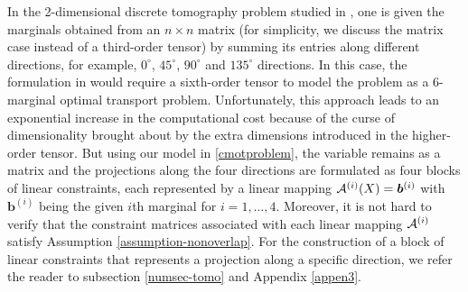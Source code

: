 \documentclass[10pt]{article}
\newcommand{\blue}[1]{\begin{color}{blue}#1\end{color}}
\newcommand{\red}[1]{\begin{color}{red}#1\end{color}}
\newcommand{\cA}{{\cal A}}
\newcommand{\R}{\mathbb R}
\begin{document}
In the 2-dimensional discrete tomography problem studied in \cite{w2006tomography}, one is given the marginals obtained from an $n\times n$ matrix (for simplicity, we discuss the matrix case instead of a third-order tensor) by summing its entries along different directions, for example, $0^\circ$, $45^\circ$, $90^\circ$ and $135^\circ$ directions.
In this case, the formulation in \cite{abraham2017tomographic} would require a sixth-order tensor to model the problem as a 6-marginal optimal transport problem. Unfortunately, this approach leads to an exponential increase in the computational cost because of the curse of dimensionality brought about by the extra dimensions introduced in the higher-order tensor. But using our model in \eqref{cmotproblem}, the variable remains as a matrix and the projections along the four directions are formulated as four blocks of linear constraints, each represented by a linear mapping $\cA^{(i)}(X) = \bm{b}^{(i)}$ with $\bm{b}^{(i)}$ being the given $i$th marginal for $i=1,\dots\!,4$. Moreover, it is not hard to verify that the constraint matrices associated with each linear mapping $\cA^{(i)}$ satisfy Assumption \ref{assumption-nonoverlap}. For the construction of a block of linear constraints that represents a projection along a specific direction, we refer the reader to subsection \ref{numsec-tomo} and Appendix \ref{appen3}.
\end{document}
